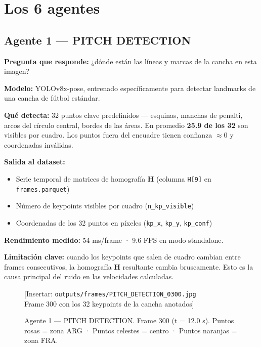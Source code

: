 \documentclass[11pt,a4paper]{article}
\begin{document}
\section{Los 6 agentes}

\subsection{Agente 1 — PITCH DETECTION}

\textbf{Pregunta que responde:} ¿dónde están las líneas y marcas de la cancha
en esta imagen?

\textbf{Modelo:} YOLOv8x-pose, entrenado específicamente para detectar
landmarks de una cancha de fútbol estándar.

\textbf{Qué detecta:} 32 puntos clave predefinidos — esquinas, manchas de
penalti, arcos del círculo central, bordes de las áreas. En promedio
\textbf{25.9 de los 32} son visibles por cuadro. Los puntos fuera del
encuadre tienen confianza $\approx 0$ y coordenadas inválidas.

\textbf{Salida al dataset:}
\begin{itemize}[noitemsep]
  \item Serie temporal de matrices de homografía $\mathbf{H}$ (columna \texttt{H[9]}
        en \texttt{frames.parquet})
  \item Número de keypoints visibles por cuadro (\texttt{n\_kp\_visible})
  \item Coordenadas de los 32 puntos en píxeles (\texttt{kp\_x}, \texttt{kp\_y},
        \texttt{kp\_conf})
\end{itemize}

\textbf{Rendimiento medido:} 54 ms/frame · 9.6 FPS en modo standalone.

\begin{alertbox}
\textbf{Limitación clave:} cuando los keypoints que salen de cuadro cambian entre
frames consecutivos, la homografía $\mathbf{H}$ resultante cambia bruscamente.
Esto es la causa principal del ruido en las velocidades calculadas.
\end{alertbox}

\begin{figure}[H]
  \centering
  \begin{mdframed}[
    linecolor=gray!40, linewidth=1pt,
    innertopmargin=50pt, innerbottommargin=50pt,
    backgroundcolor=gray!8
  ]
    \centering\color{gray!60}
    [Insertar: \texttt{outputs/frames/PITCH\_DETECTION\_0300.jpg} \\
    Frame 300 con los 32 keypoints de la cancha anotados]
  \end{mdframed}
  \caption{Agente 1 — PITCH DETECTION. Frame 300 (t = 12.0 s).
           Puntos rosas = zona ARG · Puntos celestes = centro ·
           Puntos naranjas = zona FRA.}
  \label{fig:pitch}
\end{figure}
\end{document}
